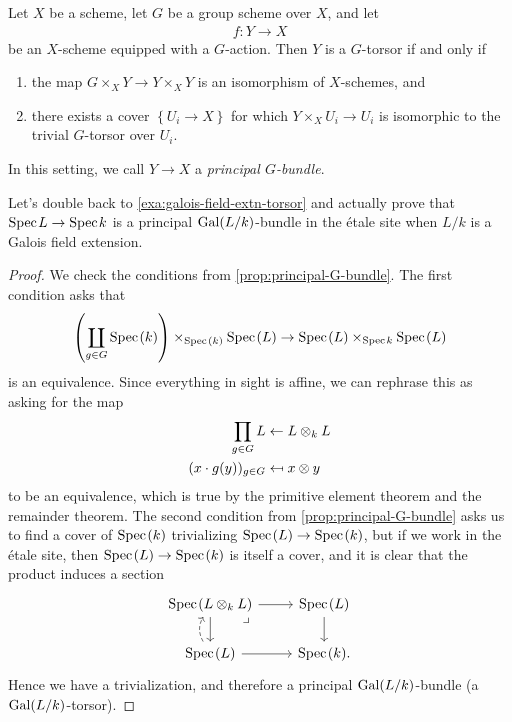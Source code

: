 \documentclass[11pt,openany]{book}
\begin{document}
\begin{proposition}\label{prop:principal-G-bundle} 
Let $X$ be a scheme, let $G$ be a group scheme over $X$, and let
\begin{align*}
    f \colon Y \to X
\end{align*}
be an $X$-scheme equipped with a $G$-action. Then $Y$ is a $G$-torsor if and only if
\begin{enumerate}
    \item the map $G \times_X Y \to Y \times_X Y$ is an isomorphism of $X$-schemes, and
    \item there exists a cover $\left\{ U_i \to X \right\}$ for which $Y \times_X U_i \to U_i$ is isomorphic to the trivial $G$-torsor over $U_i$.
\end{enumerate}
In this setting, we call $Y \to X$ a \textit{principal $G$-bundle}.
\end{proposition}

\begin{example} Let's double back to \autoref{exa:galois-field-extn-torsor} and actually prove that $\text{Spec}\hspace{0.1em} L \to \text{Spec}\hspace{0.1em} k$ is a principal $\mathrm{Gal}(L/k)$-bundle in the \'etale site when $L/k$ is a Galois field extension.
\end{example}
\begin{proof} We check the conditions from \autoref{prop:principal-G-bundle}. The first condition asks that
\begin{align*}
    \left(\coprod_{g\in G} \text{Spec}\hspace{0.1em}(k) \right) \times_{\text{Spec}\hspace{0.1em}(k)} \text{Spec}\hspace{0.1em} (L) \to \text{Spec}\hspace{0.1em}(L) \times_{\text{Spec}\hspace{0.1em} k} \text{Spec}\hspace{0.1em}(L)
\end{align*}
is an equivalence. Since everything in sight is affine, we can rephrase this as asking for the map
\begin{align*}
    \prod_{g\in G} L &\from L \otimes_k L \\
    (x \cdot g(y))_{g\in G} &\mapsfrom x \otimes y
\end{align*}
to be an equivalence, which is true by the primitive element theorem and the remainder theorem. The second condition from \autoref{prop:principal-G-bundle} asks us to find a cover of $\text{Spec}\hspace{0.1em}(k)$ trivializing $\text{Spec}\hspace{0.1em}(L) \to \text{Spec}\hspace{0.1em}(k)$, but if we work in the \'etale site, then $\text{Spec}\hspace{0.1em}(L) \to \text{Spec}\hspace{0.1em}(k)$ is itself a cover, and it is clear that the product induces a section
\[ \begin{tikzcd}
    \Spec(L \otimes_k L)\dar\rar\pb & \Spec(L)\dar\\
    \Spec(L)\rar\uar[dashed,bend left=30] & \Spec(k).
\end{tikzcd} \]
Hence we have a trivialization, and therefore a principal $\mathrm{Gal}(L/k)$-bundle (a $\mathrm{Gal}(L/k)$-torsor).
\end{proof}
\end{document}
